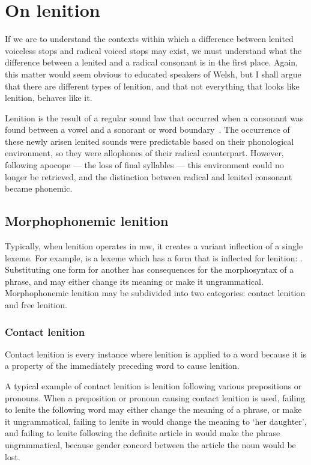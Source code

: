 \section{On lenition}
If we are to understand the contexts within which a difference between lenited voiceless stops and radical voiced stops may exist,
we must understand what the difference between a lenited and a radical consonant is in the first place. 
Again, this matter would seem obvious to educated speakers of Welsh, 
but I shall argue that there are different types of lenition, 
and that not everything that looks like lenition, behaves like it.

Lenition is the result of a regular sound law that occurred when a consonant was found between a vowel and a sonorant or word boundary~\autocite[96]{mccone_towards_1996}. 
The occurrence of these newly arisen lenited sounds were predictable based on their phonological environment, so they were allophones of their radical counterpart. 
However, following apocope --- the loss of final syllables --- this environment could no longer be retrieved, and the distinction between radical and lenited consonant became phonemic.

\subsection{Morphophonemic lenition}
Typically, when lenition operates in \gls{mw}, it creates a variant inflection of a single lexeme. 
For example,  is a lexeme which has a form that is inflected for lenition: . 
Substituting one form for another has consequences for the morphosyntax of a phrase, and may either change its meaning or make it ungrammatical.
Morphophonemic lenition may be subdivided into two categories: contact lenition and free lenition.
\subsubsection{Contact lenition}
Contact lenition is every instance where lenition is applied to a word because it is a property of the immediately preceding word to cause lenition. 

A typical example of contact lenition is lenition following various prepositions or pronouns. 
When a preposition or pronoun causing contact lenition is used, failing to lenite the following word may either change the meaning of a phrase, or make it ungrammatical, \eg failing to lenite  in  would change the meaning to `her daughter', and failing to lenite following the definite article in  would make the phrase ungrammatical, because  gender concord between the article the noun would be lost.

